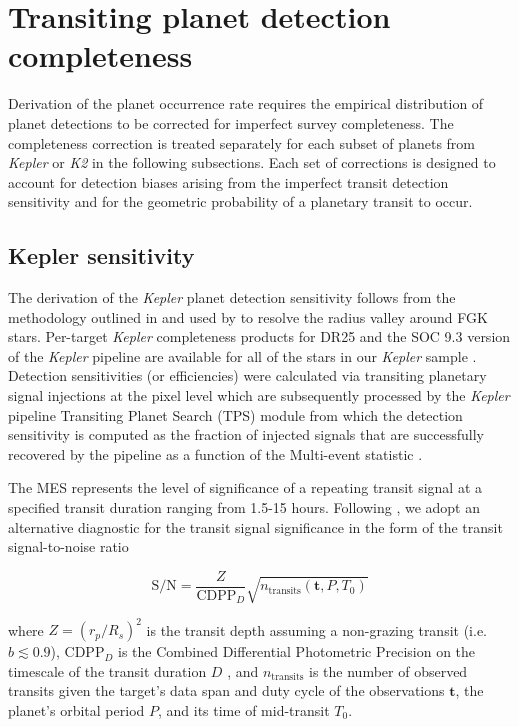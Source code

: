 \documentclass[twocolumn]{emulateapj}
\newcommand{\kepler}[1]{\emph{Kepler}#1}
\newcommand{\ktwo}[1]{\emph{K2}#1}
\begin{document}
\section{Transiting planet detection completeness}  \label{sect:completeness}
Derivation of the planet occurrence rate requires the empirical distribution of planet detections to be corrected
for imperfect survey completeness. The completeness correction is treated separately for each subset
of planets from \kepler{} or \ktwo{} in the following subsections. Each set of corrections is designed to account
for detection biases arising from the imperfect transit detection sensitivity and for the 
geometric probability of a planetary transit to occur.

\subsection{Kepler sensitivity} \label{sect:kepsens}
The derivation of the \kepler{} planet detection sensitivity follows from the methodology outlined in
\cite{christiansen16} and used by \cite{fulton17} to resolve the radius valley around FGK stars. Per-target
\kepler{} completeness products for DR25 and the SOC 9.3 version of the \kepler{} pipeline
\citep{jenkins10} are available
for all of the stars in our \kepler{} sample \citep{burke15,burke17}. Detection sensitivities
(or efficiencies) were calculated via transiting planetary signal injections at the pixel level
which are subsequently processed by the \kepler{} pipeline Transiting Planet Search (TPS) module from
which the detection sensitivity is computed as the fraction of
injected signals that are successfully recovered by the pipeline as a function of the Multi-event statistic
\citep[MES;][]{christiansen15,christiansen17}.

The MES represents the level of significance of a repeating transit signal at a specified transit duration ranging
from 1.5-15 hours. Following \cite{petigura18}, we adopt an alternative diagnostic for the transit signal significance
in the form of the transit signal-to-noise ratio

\begin{equation}
  \text{S/N} = \frac{Z}{\text{CDPP}_D} \sqrt{n_{\text{transits}}(\mathbf{t},P,T_0)}  \label{eq:snr}
\end{equation}

\noindent where $Z=(r_p/R_s)^2$ is the transit depth assuming a non-grazing transit (i.e. $b\lesssim 0.9$),
CDPP$_D$ is the Combined Differential Photometric
Precision on the timescale of the transit duration $D$ \citep{koch10}, and $n_{\text{transits}}$ is the number of
observed transits given the target's data span and duty cycle
of the observations $\mathbf{t}$, the planet's orbital period $P$, and its time of mid-transit $T_0$.
\end{document}
